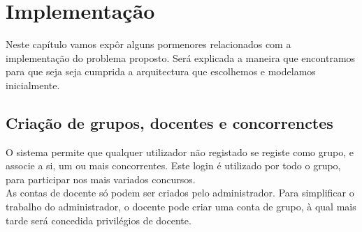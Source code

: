 \chapter{Implementação} \label{chap implem}
\minitoc
Neste capítulo vamos expôr alguns pormenores relacionados com a implementação do problema proposto.
Será explicada a maneira que encontramos para que seja seja cumprida a arquitectura que escolhemos e modelamos inicialmente.

\section{Criação de grupos, docentes e concorrenctes}\label{sec gdc}
O sistema permite que qualquer utilizador não registado se registe como grupo, e associe a si, um ou mais concorrentes. Este login
é utilizado por todo o grupo, para participar nos mais variados concursos.\\
As contas de docente só podem ser criados pelo administrador. Para simplificar o trabalho do administrador, o docente pode criar 
uma conta de grupo, à qual mais tarde será concedida privilégios de docente.



